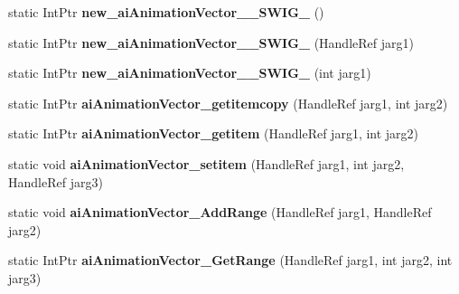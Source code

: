 \begin{DoxyCompactItemize}
\item 
\hypertarget{class_assimp_p_i_n_v_o_k_e_abd82fcd0bf901631279ba4ceb3fd2ac8}{static Int\+Ptr {\bfseries new\+\_\+ai\+Animation\+Vector\+\_\+\+\_\+\+S\+W\+I\+G\+\_} ()}\label{class_assimp_p_i_n_v_o_k_e_abd82fcd0bf901631279ba4ceb3fd2ac8}

\item 
\hypertarget{class_assimp_p_i_n_v_o_k_e_a1a93645f85695304c4a6f94817d2f5bf}{static Int\+Ptr {\bfseries new\+\_\+ai\+Animation\+Vector\+\_\+\+\_\+\+S\+W\+I\+G\+\_} (Handle\+Ref jarg1)}\label{class_assimp_p_i_n_v_o_k_e_a1a93645f85695304c4a6f94817d2f5bf}

\item 
\hypertarget{class_assimp_p_i_n_v_o_k_e_a66cb826a116582631fd04a3620e5df65}{static Int\+Ptr {\bfseries new\+\_\+ai\+Animation\+Vector\+\_\+\+\_\+\+S\+W\+I\+G\+\_} (int jarg1)}\label{class_assimp_p_i_n_v_o_k_e_a66cb826a116582631fd04a3620e5df65}

\item 
\hypertarget{class_assimp_p_i_n_v_o_k_e_ae70b6fb2494f590b5578166a9a18324f}{static Int\+Ptr {\bfseries ai\+Animation\+Vector\+\_\+getitemcopy} (Handle\+Ref jarg1, int jarg2)}\label{class_assimp_p_i_n_v_o_k_e_ae70b6fb2494f590b5578166a9a18324f}

\item 
\hypertarget{class_assimp_p_i_n_v_o_k_e_a26dc05dcd0c151ce513070426c744f4c}{static Int\+Ptr {\bfseries ai\+Animation\+Vector\+\_\+getitem} (Handle\+Ref jarg1, int jarg2)}\label{class_assimp_p_i_n_v_o_k_e_a26dc05dcd0c151ce513070426c744f4c}

\item 
\hypertarget{class_assimp_p_i_n_v_o_k_e_aac3528f704e5baa6c7e2a37e1f62f6e5}{static void {\bfseries ai\+Animation\+Vector\+\_\+setitem} (Handle\+Ref jarg1, int jarg2, Handle\+Ref jarg3)}\label{class_assimp_p_i_n_v_o_k_e_aac3528f704e5baa6c7e2a37e1f62f6e5}

\item 
\hypertarget{class_assimp_p_i_n_v_o_k_e_af6490da96d2bede634fffa9ba85816b8}{static void {\bfseries ai\+Animation\+Vector\+\_\+\+Add\+Range} (Handle\+Ref jarg1, Handle\+Ref jarg2)}\label{class_assimp_p_i_n_v_o_k_e_af6490da96d2bede634fffa9ba85816b8}

\item 
\hypertarget{class_assimp_p_i_n_v_o_k_e_a4aaba41d211f7c05d691f94f3d673c37}{static Int\+Ptr {\bfseries ai\+Animation\+Vector\+\_\+\+Get\+Range} (Handle\+Ref jarg1, int jarg2, int jarg3)}\label{class_assimp_p_i_n_v_o_k_e_a4aaba41d211f7c05d691f94f3d673c37}


\end{DoxyCompactItemize}
